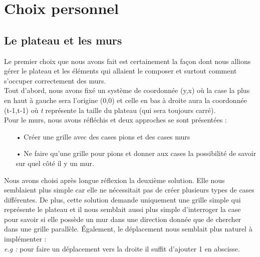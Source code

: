 \documentclass[a4paper, 12pt]{article}
\begin{document}
\section{Choix personnel}
\subsection{Le plateau et les murs}
Le premier choix que nous avons fait est certainement la façon dont nous allions gérer le plateau et les éléments qui allaient le composer et surtout comment s'occuper correctement
des murs. \\

Tout d'abord, nous avons fixé un système de coordonnée (y,x) où la case la plus en haut à gauche sera l'origine (0,0) et celle en bas à droite aura la coordonnée (t-1,t-1) où \textit{t} représente la taille du plateau (qui sera toujours carré). \\

Pour le murs, nous avons réfléchis et deux approches se sont présentées : 
\begin{itemize}
\item[•] Créer une grille avec des cases pions et des cases murs
\item[•] Ne faire qu'une grille pour pions et donner aux cases la possibilité de savoir sur quel côté il y un mur.
\end{itemize}
Nous avons choisi après longue réflexion la deuxième solution. Elle nous semblaient plus simple car elle ne nécessitait pas de créer plusieurs types de cases différentes. De plus, cette solution demande uniquement une grille simple qui représente le plateau et il nous semblait aussi plus simple d'interroger la case pour savoir si elle possède un mur dans une direction donnée que de chercher dans une grille parallèle. Également, le déplacement nous semblait plus naturel à implémenter : \\
\textit{e.g :} pour faire un déplacement vers la droite il suffit d'ajouter 1 en abscisse. \\
\end{document}
